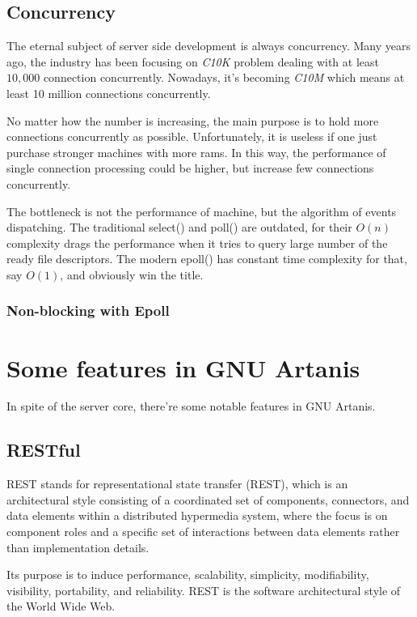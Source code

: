 \documentclass[preprint,numbers,numberedpars,10pt]{sigplanconf}
\begin{document}
\subsection{Concurrency}

The eternal subject of server side development is always concurrency.
Many years ago, the industry has been focusing on {\it C10K} problem dealing with at least $10,000$ connection concurrently.
Nowadays, it's becoming {\it C10M} which means at least 10 million connections concurrently.

No matter how the number is increasing, the main purpose is to hold more connections concurrently as possible.
Unfortunately, it is useless if one just purchase stronger machines with more rams. In this way, the performance of single connection
processing could be higher, but increase few connections concurrently.

The bottleneck is not the performance of machine, but the algorithm of events dispatching. The traditional select() and poll() are outdated,
for their $O(n)$ complexity drags the performance when it tries to query large number of the ready file descriptors. The modern epoll() has
constant time complexity for that, say $O(1)$, and obviously win the title.

\subsubsection{Non-blocking with Epoll} \label{Non-blocking with Epoll}

\section{Some features in GNU Artanis} \label{Some features in GNU Artanis}

In spite of the server core, there're some notable features in GNU Artanis.

\subsection{RESTful}

REST stands for representational state transfer (REST), which is an architectural style consisting of a coordinated set of components, connectors,
and data elements within a distributed hypermedia system, where the focus is on component roles and a specific set of interactions between data
elements rather than implementation details.

Its purpose is to induce performance, scalability, simplicity, modifiability, visibility, portability, and reliability.
REST is the software architectural style of the World Wide Web.
\end{document}
